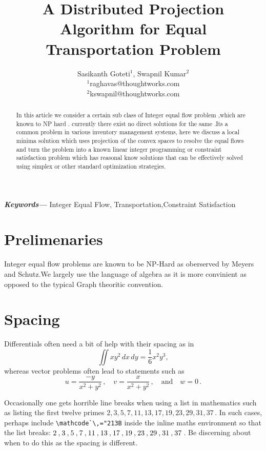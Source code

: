 \documentclass[a4paper]{article}
\title{A Distributed Projection Algorithm for Equal Transportation Problem}
\author{Sasikanth Goteti$^{1}$, Swapnil Kumar$^{2}$  \\
            \small $^{1}$raghavas@thoughtworks.com \\
            \small $^{2}$kswapnil@thoughtworks.com \\
    }
\date{} %
\providecommand{\keywords}[1]
    {
      \small	
      \textbf{\textit{Keywords---}} #1
    }
\begin{document}
    \maketitle
    
    \begin{abstract}
        In this article we consider a certain sub class of Integer equal flow problem ,which are known to NP hard \cite{meyers}. 
        currently there exist no direct solutions for the same .Its a common problem in various inventory management systems,
        here we discuss a local minima solution which uses projection of the convex spaces to resolve the equal flows and turn 
        the problem into a known linear integer programming or constraint satisfaction problem which has reasonal know solutions that can be 
        effectively solved using simplex or other standard optimization strategies.
       \end{abstract}
       \keywords{Integer Equal Flow, Transportation,Constraint Satisfaction}
     
       \maketitle
    

    
    
    
    \section{Prelimenaries}
    Integer equal flow problems are known to be NP-Hard as oberserved by Meyers and Schutz\cite{meyers}.We largely use the
    language of algebra as it is more convinient as opposed to the typical Graph theoritic convention. 
    
    
    
    
    
    
    \section{Spacing}
    
    Differentials often need a bit of help with their spacing as in
    \[
        \iint xy^2\,dx\,dy 
        =\frac{1}{6}x^2y^3,
    \]
    whereas vector problems often lead to statements such as
    \[
        u=\frac{-y}{x^2+y^2}\,,\quad
        v=\frac{x}{x^2+y^2}\,,\quad\text{and}\quad
        w=0\,.
    \]

    Occasionally one gets horrible line breaks when using a list in mathematics such as 
    listing the first twelve primes  \(2,3,5,7,11,13,17,19,23,29,31,37\)\,.
    In such cases, perhaps include \verb|\mathcode`\,="213B| inside the inline maths environment so that the list breaks: \(\mathcode`\,="213B 2,3,5,7,11,13,17,19,23,29,31,37\)\,.
    Be discerning about when to do this as the spacing is different.
    
\end{document}
